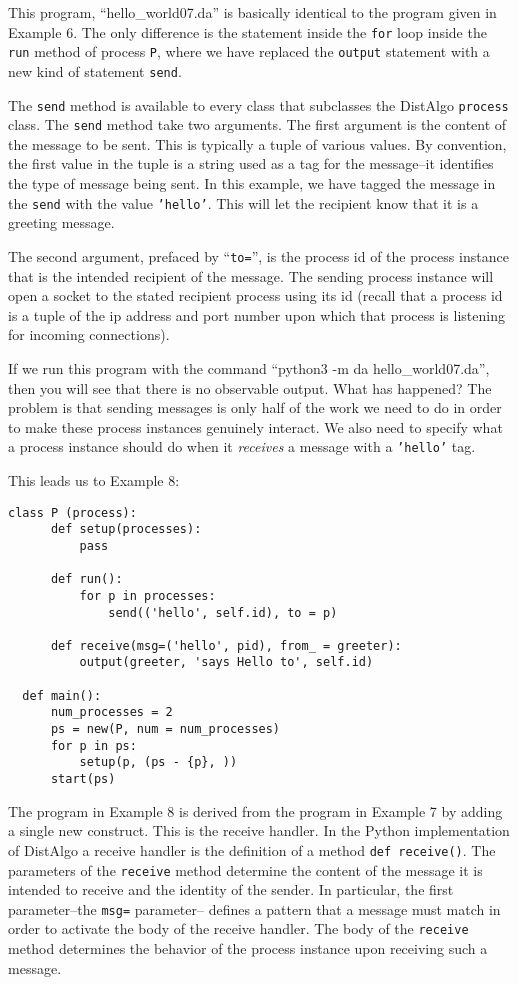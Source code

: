 \documentclass[11pt]{article}
\begin{document}
\noindent This program, ``hello_world07.da'' is basically identical to the
program given in Example 6. The only difference is the statement inside the
\texttt{for} loop inside the \texttt{run} method of process \texttt{P}, where
we have replaced the \texttt{output} statement with a new kind of statement
\texttt{send}.

The \texttt{send} method is available to every class that subclasses the
DistAlgo \texttt{process} class. The \texttt{send} method take two arguments.
The first argument is the content of the message to be sent. This is typically
a tuple of various values. By convention, the first value in the tuple is a
string used as a tag for the message--it identifies the type of message being
sent. In this example, we have tagged the message in the \texttt{send} with the
value \texttt{'hello'}. This will let the recipient know that it is a greeting
message.

The second argument, prefaced by ``\texttt{to=}'', is the process id of
the process instance that is the intended recipient of the message. The sending
process instance will open a socket to the stated recipient process using its
id (recall that a process id is a tuple of the ip address and port number upon
which that process is listening for incoming connections).

If we run this program with the command ``python3 -m da hello_world07.da'',
then you will see that there is no observable output. What has happened? The
problem is that sending messages is only half of the work we need to do in
order to make these process instances genuinely interact. We also need to
specify what a process instance should do when it \textit{receives} a message
with a \texttt{'hello'} tag.

This leads us to Example 8:
\begin{lstlisting}[caption={hello\_world08.da - Receive Handler}, label={lst:hw08}]
  class P (process):
      def setup(processes):
          pass

      def run():
          for p in processes:
              send(('hello', self.id), to = p)

      def receive(msg=('hello', pid), from_ = greeter):
          output(greeter, 'says Hello to', self.id)

  def main():
      num_processes = 2
      ps = new(P, num = num_processes)
      for p in ps:
          setup(p, (ps - {p}, ))
      start(ps)
\end{lstlisting}

\noindent The program in Example 8 is derived from the program in Example 7 by adding a
single new construct. This is the receive handler. In the Python implementation
of DistAlgo a receive handler is the definition of a method \texttt{def
  receive()}. The parameters of the \texttt{receive} method determine the
content of the message it is intended to receive and the identity of the
sender. In particular, the first parameter--the \texttt{msg=} parameter--
defines a pattern that a message must match in order to activate the body of
the receive handler. The body of the \texttt{receive} method determines the
behavior of the process instance upon receiving such a message.
\end{document}
